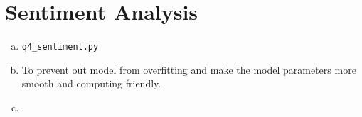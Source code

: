 \documentclass[11pt]{article}
\begin{document}
\section{Sentiment Analysis}
\label{sec:4}

\begin{enumerate}[(a)]
\item \verb|q4_sentiment.py|
\item To prevent out model from overfitting and make the model parameters more
  smooth and computing friendly.
\item 
\end{enumerate}
\end{document}

